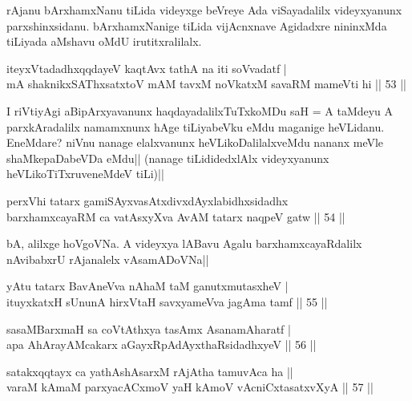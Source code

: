 \begin{artha}
rAjanu bArxhamxNanu tiLida videyxge beVreye Ada viSayadalilx 
videyxyanunx parxshinxsidanu. bArxhamxNanige tiLida vijAcnxnave 
Agidadxre nininxMda tiLiyada aMshavu oMdU irutitxralilalx. 
\end{artha}

\begin{shl}
iteyxVtadadhxqqdayeV kaqtAvx tathA na iti soV\s vadatf | \\
mA shaknikxSAThxsatxtoV mAM tavxM noVkatxM savaRM mameVti hi \hfill|| 53 || 
\end{shl} 

\begin{artha}
I riVtiyAgi aBipArxyavanunx haqdayadalilxTuTxkoMDu saH = A taMdeyu A 
parxkAradalilx namamxnunx hAge tiLiyabeVku eMdu maganige heVLidanu. 
EneMdare? niVnu nanage elalxvanunx heVLikoDalilalxveMdu nananx meVle 
shaMkepaDabeVDa eMdu|| (nanage tiLididedxlAlx videyxyanunx 
heVLikoTiTxruveneMdeV tiLi)||
\end{artha}

\begin{shl}
perxVhi tatarx gamiSAyxvasAtxdivxdAyxlabidhxsidadhx\\
barxhamxcayaRM ca vatAsxyXva AvAM tatarx naqpeV gatw \hfill|| 54 || 
\end{shl}

\begin{artha}
bA, alilxge hoVgoVNa. A videyxya lABavu Agalu barxhamxcayaRdalilx 
nAvibabxrU rAjanalelx vAsamADoVNa||
\end{artha}


\begin{shl}
yAtu tatarx BavAneVva nAhaM taM ganutxmutasxheV | \\
ituyxkatxH sUnunA hirxVtaH savxyameVva jagAma tamf \hfill|| 55 || 
\end{shl}

\begin{shl}
sasaMBarxmaH sa coVtAthxya tasAmx AsanamAharatf | \\
apa AhArayAMcakarx aGayxRpAdAyxthaRsidadhxyeV \hfill|| 56 || 
\end{shl}

\begin{shl}
satakxqqtayx ca yathAshAsarxM rAjA\s tha tamuvAca ha || \\
varaM kAmaM parxyacACxmoV yaH kAmoV vAcniCxtasatxvXyA \hfill|| 57 || 
\end{shl}

